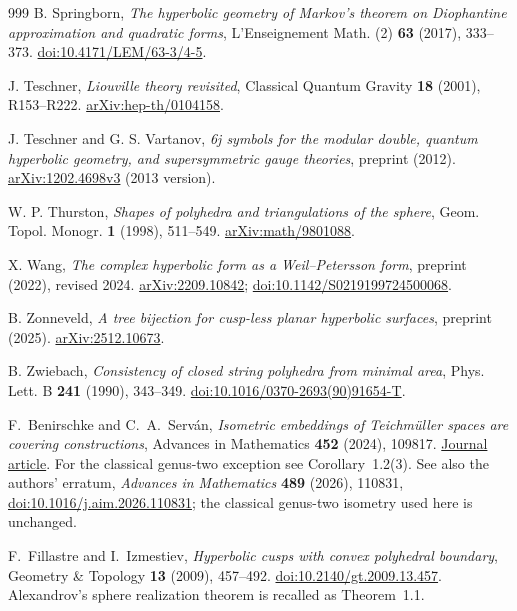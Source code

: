 \documentclass[11pt,a4paper]{article}
\numberwithin{equation}{section}
\theoremstyle{definition}
\theoremstyle{remark}
\begin{document}
\begin{thebibliography}{999}
B. Springborn,
\emph{The hyperbolic geometry of Markov's theorem on Diophantine
approximation and quadratic forms},
L'Enseignement Math. (2) \textbf{63} (2017), 333--373.
\href{https://doi.org/10.4171/LEM/63-3/4-5}{doi:10.4171/LEM/63-3/4-5}.

J. Teschner,
\emph{Liouville theory revisited},
Classical Quantum Gravity \textbf{18} (2001), R153--R222.
\href{https://arxiv.org/abs/hep-th/0104158}{arXiv:hep-th/0104158}.

J. Teschner and G. S. Vartanov,
\emph{6j symbols for the modular double, quantum hyperbolic geometry,
and supersymmetric gauge theories}, preprint (2012).
\href{https://arxiv.org/abs/1202.4698v3}{arXiv:1202.4698v3} (2013 version).

W. P. Thurston,
\emph{Shapes of polyhedra and triangulations of the sphere},
Geom. Topol. Monogr. \textbf{1} (1998), 511--549.
\href{https://arxiv.org/abs/math/9801088}{arXiv:math/9801088}.

X. Wang,
\emph{The complex hyperbolic form as a Weil--Petersson form},
preprint (2022), revised 2024.
\href{https://arxiv.org/abs/2209.10842}{arXiv:2209.10842};
\href{https://doi.org/10.1142/S0219199724500068}{doi:10.1142/S0219199724500068}.

B. Zonneveld,
\emph{A tree bijection for cusp-less planar hyperbolic surfaces},
preprint (2025).
\href{https://arxiv.org/abs/2512.10673}{arXiv:2512.10673}.

B. Zwiebach,
\emph{Consistency of closed string polyhedra from minimal area},
Phys. Lett. B \textbf{241} (1990), 343--349.
\href{https://doi.org/10.1016/0370-2693(90)91654-T}{doi:10.1016/0370-2693(90)91654-T}.

F.~Benirschke and C.~A.~Serv\'an,
\emph{Isometric embeddings of Teichm\"uller spaces are covering constructions},
Advances in Mathematics \textbf{452} (2024), 109817.
\href{https://doi.org/10.1016/j.aim.2024.109817}{Journal article}.
For the classical genus-two exception see Corollary~1.2(3).
See also the authors' erratum, \emph{Advances in Mathematics}
\textbf{489} (2026), 110831,
\href{https://doi.org/10.1016/j.aim.2026.110831}{doi:10.1016/j.aim.2026.110831};
the classical genus-two isometry used here is unchanged.

F.~Fillastre and I.~Izmestiev,
\emph{Hyperbolic cusps with convex polyhedral boundary},
Geometry \& Topology \textbf{13} (2009), 457--492.
\href{https://doi.org/10.2140/gt.2009.13.457}{doi:10.2140/gt.2009.13.457}.
Alexandrov's sphere realization theorem is recalled as Theorem~1.1.


\end{thebibliography}
\end{document}
